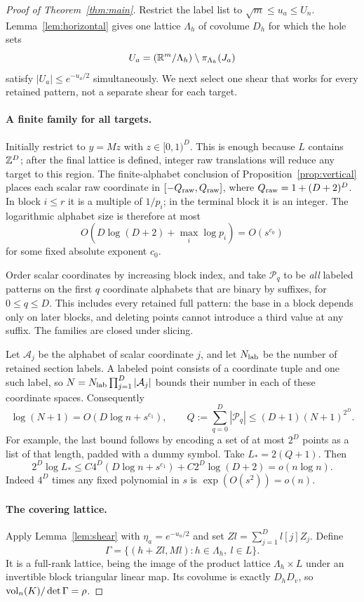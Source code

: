 \begin{proof}[Proof of Theorem~\ref{thm:main}]
Restrict the label list to $\sqrt m\le u_a\le U_n$.
Lemma~\ref{lem:horizontal} gives one lattice $\Lambda_h$ of covolume
$D_h$ for which the hole sets
\[
 U_a=(\mathbb R^m/\Lambda_h)\setminus\pi_{\Lambda_h}(J_a)
\]
satisfy $|U_a|\le e^{-u_a/2}$ simultaneously. We next select one
shear that works for every retained pattern, not a separate shear
for each target.

\paragraph{A finite family for all targets.}
Initially restrict to $y=Mz$ with $z\in[0,1)^D$. This is enough
because $L$ contains $\mathbb Z^D$; after the final lattice is defined,
integer raw translations will reduce any target to this region.
The finite-alphabet conclusion of Proposition~\ref{prop:vertical}
places each scalar raw coordinate in $[-Q_{\rm raw},Q_{\rm raw}]$, where
$Q_{\rm raw}=1+(D+2)^D$. In block $i\le r$ it is a multiple of $1/p_i$;
in the terminal block it is an integer. The logarithmic alphabet size
is therefore at most
\[
 O(D\log(D+2)+\max_i\log p_i)=O(s^{c_0})
\]
for some fixed absolute exponent $c_0$.

Order scalar coordinates by increasing block index, and take
$\mathcal P_q$ to be \emph{all} labeled patterns on the first $q$
coordinate alphabets that are binary by suffixes, for $0\le q\le D$.
This includes every retained full pattern: the base in a block depends
only on later blocks, and deleting points cannot introduce a third
value at any suffix. The families are closed under slicing.

Let $\mathcal A_j$ be the alphabet of scalar coordinate $j$, and let
$N_{\rm lab}$ be the number of retained section labels. A labeled point
consists of a coordinate tuple and one such label, so
$N=N_{\rm lab}\prod_{j=1}^D|\mathcal A_j|$ bounds their number in
each of these coordinate spaces. Consequently
\[
 \log(N+1)=O(D\log n+s^{c_1}),\qquad
 Q:=\sum_{q=0}^D|\mathcal P_q|
       \le (D+1)(N+1)^{2^D}.
\]
For example, the last bound follows by encoding a set of at most
$2^D$ points as a list of that length, padded with a dummy symbol.
Take $L_*=2(Q+1)$. Then
\begin{equation}\label{eq:pattern-cost}
 2^D\log L_*
 \le C4^D(D\log n+s^{c_1})+C2^D\log(D+2)
 =o(n\log n).
\end{equation}
Indeed $4^D$ times any fixed polynomial in $s$ is
$\exp(O(s^2))=o(n)$.

\paragraph{The covering lattice.}
Apply Lemma~\ref{lem:shear} with $\eta_a=e^{-u_a/2}$ and set
$Zl=\sum_{j=1}^D l[j]Z_j$. Define
\begin{equation}\label{eq:full-lattice}
 \Gamma=\{(h+Zl,Ml):h\in\Lambda_h,\ l\in L\}.
\end{equation}
It is a full-rank lattice, being the image of the product lattice
$\Lambda_h\times L$ under an invertible block triangular linear
map. Its covolume is exactly $D_hD_v$, so
$\operatorname{vol}_n(K)/\det\Gamma=\rho$.


\end{proof}

